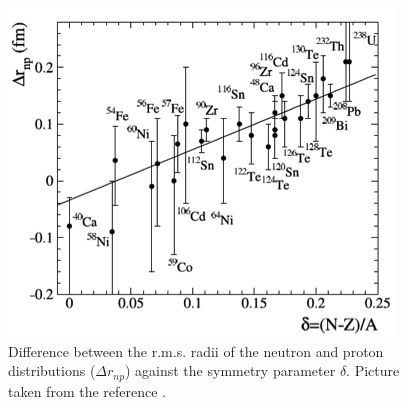 \begin{figure}[H]
\begin{center}
\includegraphics[scale=0.7]{pictures/png/antiproton.png}
\caption{Difference between the r.m.s. radii of the neutron and proton distributions ($\Delta r_{np}$) against the symmetry parameter $\delta$. Picture taken from the reference \cite{trzcina}.}
\label{antiproton}
\end{center}
\end{figure}




